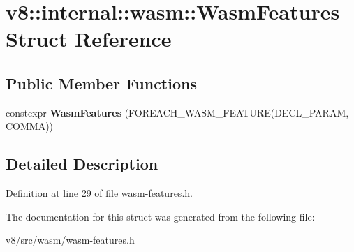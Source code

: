 \hypertarget{structv8_1_1internal_1_1wasm_1_1WasmFeatures}{}\section{v8\+:\+:internal\+:\+:wasm\+:\+:Wasm\+Features Struct Reference}
\label{structv8_1_1internal_1_1wasm_1_1WasmFeatures}
\subsection*{Public Member Functions}
\begin{DoxyCompactItemize}
\item 
\mbox{\label{structv8_1_1internal_1_1wasm_1_1WasmFeatures_a6eb4c92cfbadfadcc0befda3db7659d2}} 
constexpr {\bfseries Wasm\+Features} (F\+O\+R\+E\+A\+C\+H\+\_\+\+W\+A\+S\+M\+\_\+\+F\+E\+A\+T\+U\+RE(D\+E\+C\+L\+\_\+\+P\+A\+R\+AM, C\+O\+M\+MA))
\end{DoxyCompactItemize}


\subsection{Detailed Description}


Definition at line 29 of file wasm-\/features.\+h.



The documentation for this struct was generated from the following file\+:\begin{DoxyCompactItemize}
\item 
v8/src/wasm/wasm-\/features.\+h\end{DoxyCompactItemize}
